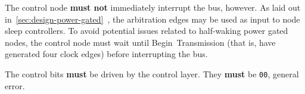 The control node {\bf must not} immediately interrupt the bus, however. As
laid out in~\ref{sec:design-power-gated}~, the
arbitration edges may be used as input to node sleep controllers. To avoid
potential issues related to half-waking power gated nodes, the control node
must wait until Begin~Transmission (that is, have generated four clock edges)
before interrupting the bus.

The control bits {\bf must} be driven by the control layer. They {\bf must} be
{\tt 00}, general error.
